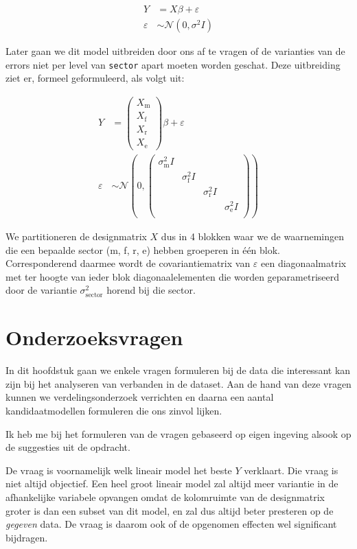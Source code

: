 \documentclass[a4paper]{report}
\begin{document}
  \begin{align}
  Y &= X\beta + \varepsilon \\
  \varepsilon &\sim \mathcal{N}(0,\sigma^2I)
  \end{align}
  
  Later gaan we dit model uitbreiden door ons af te vragen of de varianties van de errors niet per level van \verb!sector! apart moeten worden geschat. Deze uitbreiding ziet er, formeel geformuleerd, als volgt uit:
  
  \begin{align}
  Y &= \begin{pmatrix} X_{\text{m}}  \\ X_{\text{f}} \\ X_{\text{r}} \\ X_{\text{e}} \end{pmatrix}\beta + \varepsilon \\
  \varepsilon &\sim \mathcal{N}(0,
  \begin{pmatrix} 
  \sigma_{\text{m}}^2I & & & \\ 
  & \sigma_{\text{f}}^2I & & \\ 
  & & \sigma_{\text{r}}^2I & \\
  & & & \sigma_{\text{e}}^2I \\
  \end{pmatrix})
  \end{align}
  
  We partitioneren de designmatrix $X$ dus in 4 blokken waar we de waarnemingen die een bepaalde sector (m, f, r, e) hebben groeperen in \' e\' en blok. Corresponderend daarmee wordt de covariantiematrix van $\varepsilon$ een diagonaalmatrix met ter hoogte van ieder blok diagonaalelementen die worden geparametriseerd door de variantie $\sigma_{\text{sector}}^2$ horend bij die sector.

\section{Onderzoeksvragen}
  In dit hoofdstuk gaan we enkele vragen formuleren bij de data die interessant kan zijn bij het analyseren van verbanden in de dataset. Aan de hand van deze vragen kunnen we verdelingsonderzoek verrichten en daarna een aantal kandidaatmodellen formuleren die ons zinvol lijken.
  
  Ik heb me bij het formuleren van de vragen gebaseerd op eigen ingeving alsook op de suggesties uit de opdracht.  
  
  De vraag is voornamelijk welk lineair model het beste $Y$ verklaart. Die vraag is niet altijd objectief. Een heel groot lineair model zal altijd meer variantie in de afhankelijke variabele opvangen omdat de kolomruimte van de designmatrix groter is dan een subset van dit model, en zal dus altijd beter presteren op de \emph{gegeven} data. De vraag is daarom ook of de opgenomen effecten wel significant bijdragen.
  
\end{document}
